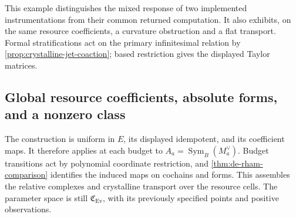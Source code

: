 \documentclass[11pt,a4paper]{article}
\numberwithin{algorithm}{section}
\numberwithin{equation}{section}
\theoremstyle{definition}
\theoremstyle{remark}
\theoremstyle{plain}
\newcommand{\Sym}{\operatorname{Sym}}
\newcommand{\Ev}{{\operatorname{Ev}}}
\newcommand{\Cplx}{\mathfrak C_{\Ev}}
\theoremstyle{definition}
\theoremstyle{plain}
\begin{document}
This example distinguishes the mixed response of two implemented
instrumentations from their common returned computation. It also
exhibits, on the same resource coefficients, a curvature obstruction
and a flat transport. Formal stratifications act on the
primary infinitesimal relation by \cref{prop:crystalline-jet-coaction};
based restriction gives the displayed Taylor matrices.

\subsection{Global resource coefficients, absolute forms, and a nonzero class}
\label{sec:derham-global}
The construction is uniform in $E$, its displayed idempotent,
and its coefficient maps. It therefore applies at each budget
to $A_a=\Sym_B(M_a^\vee)$. Budget transitions act by polynomial
coordinate restriction, and \cref{thm:de-rham-comparison}
identifies the induced maps on cochains and forms.
This assembles the relative complexes and crystalline transport
over the resource cells. The parameter space is still $\Cplx$,
with its previously specified points and positive observations.
\end{document}
